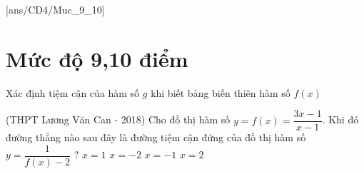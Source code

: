 [ans/CD4/Muc_9_10]
\section{Mức độ 9,10 điểm}
\setcounter{dang}{0}
\setcounter{ex}{0}
\begin{dang}{Xác định tiệm cận của hàm số $g$ khi biết bảng biến thiên hàm số $f\left(x\right)$}
\end{dang}

\begin{ex}%
	(THPT Lương Văn Can - 2018) Cho đồ thị hàm số $y=f(x)=\dfrac{3 x-1}{x-1}$. Khi đó đường thẳng nào sau đây là đường tiệm cận đứng của đồ thị hàm số $y=\dfrac{1}{f(x)-2}$ ?
	\choice
	{$x=1$}
	{$x=-2$}
	{\True $x=-1$}
	{$x=2$}
\end{ex}

